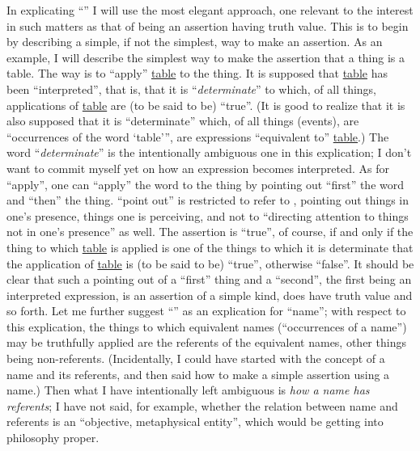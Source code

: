 In explicating \enquote{} I will use the most elegant approach, one relevant to the interest in such matters as that of being an assertion having truth value. This is to begin by describing a simple, if not the simplest, way to make an assertion. As an example, I will describe the simplest way to make the assertion that a thing is a table. The way is to \enquote{apply} \uline{table} to the thing. It is supposed that \uline{table} has been \enquote{interpreted}, that is, that it is \enquote{\emph{determinate}} to which, of all things, applications of \uline{table} are (to be said to be) \enquote{true}. (It is good to realize that it is also supposed that it is \enquote{determinate} which, of all things (events), are \enquote{occurrences of the word \enquote{table}}, are expressions \enquote{equivalent to} \uline{table}.) The word \enquote{\emph{determinate}} is the intentionally ambiguous one in this explication; I don't want to commit myself yet on how an expression becomes interpreted. As for \enquote{apply}, one can \enquote{apply} the word to the thing by pointing out \enquote{first} the word and \enquote{then} the thing. \enquote{point out} is restricted to refer to , pointing out things in one's presence, things one is perceiving, and not to \enquote{directing attention to things not in one's presence} as well. The assertion is \enquote{true}, of course, if and only if the thing to which \uline{table} is applied is one of the things to which it is determinate that the application of \uline{table} is (to be said to be) \enquote{true}, otherwise \enquote{false}. It should be clear that such a pointing out of a \enquote{first} thing and a \enquote{second}, the first being an interpreted expression, is an assertion of a simple kind, does have truth value and so forth. Let me further suggest \enquote{} as an explication for \enquote{name}; with respect to this explication, the things to which equivalent names (\enquote{occurrences of a name}) may be truthfully applied are the referents of the equivalent names, other things being non-referents. (Incidentally, I could have started with the concept of a name and its referents, and then said how to make a simple assertion using a name.) Then what I have intentionally left ambiguous is \emph{how a name has referents}; I have not said, for example, whether the relation between name and referents is an \enquote{objective, metaphysical entity}, which would be getting into philosophy proper. 

